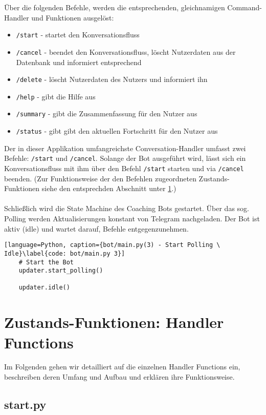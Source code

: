         Über die folgenden Befehle, werden die entsprechenden, gleichnamigen Command-Handler und Funktionen ausgelöst: 
        \begin{itemize}
            \item \verb|/start| - startet den Konversationsfluss
            \item \verb|/cancel| - beendet den Konversationsfluss, löscht Nutzerdaten aus der Datenbank und informiert entsprechend
            \item \verb|/delete| - löscht Nutzerdaten des Nutzers und informiert ihn
            \item \verb|/help| - gibt die Hilfe aus
            \item \verb|/summary| - gibt die Zusammenfassung für den Nutzer aus
            \item \verb|/status| - gibt gibt den aktuellen Fortschritt für den Nutzer aus
        \end{itemize}
        Der in dieser Applikation umfangreichste Conversation-Handler umfasst zwei Befehle: \verb|/start| und \verb|/cancel|. Solange der Bot ausgeführt wird, lässt sich ein Konversationsfluss mit ihm über den Befehl \verb|/start| starten und via \verb|/cancel| beenden. (Zur Funktionsweise der den Befehlen zugeordneten Zustands-Funktionen siehe den entsprechden Abschnitt unter \ref{Implementierung: Handler Functions}.) \\ \\
        
        Schließlich wird die State Machine des Coaching Bots gestartet. Über das sog. Polling werden Aktualisierungen konstant von Telegram nachgeladen. Der Bot ist aktiv (idle) und wartet darauf, Befehle entgegenzunehmen.
        \begin{lstlisting}[language=Python, caption={bot/main.py(3) - Start Polling \ Idle}\label{code: bot/main.py 3}]
    # Start the Bot
    updater.start_polling()

    updater.idle()
        \end{lstlisting}


    \section{Zustands-Funktionen: Handler Functions} \label{Implementierung: Handler Functions}
        Im Folgenden gehen wir detailliert auf die einzelnen Handler Functions ein, beschreiben deren Umfang und Aufbau und erklären ihre Funktionsweise. 

        \subsection{start.py} \label{Implementierung: start.py}

